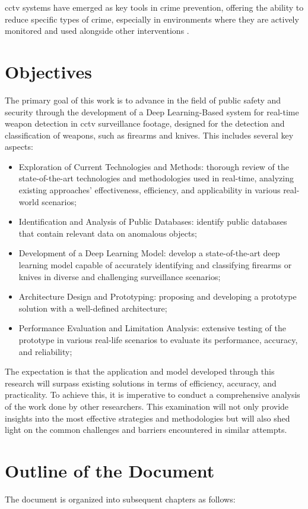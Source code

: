 \ac{cctv} systems have emerged as key tools in crime prevention, offering the ability to reduce specific types of crime, especially in environments where they are actively monitored and used alongside other interventions \cite{rfc35}. 
\section{Objectives}
The primary goal of this work is to advance in the field of public safety and security through the development of a Deep Learning-Based system for real-time weapon detection in \ac{cctv} surveillance footage, designed for the detection and classification of weapons, such as firearms and knives. This includes several key aspects:
\begin{itemize}
    \item Exploration of Current Technologies and Methods: thorough review of the state-of-the-art technologies and methodologies used in real-time, analyzing existing approaches' effectiveness, efficiency, and applicability in various real-world scenarios;
    \item Identification and Analysis of Public Databases: identify public databases that contain relevant data on anomalous objects;
    \item Development of a Deep Learning Model: develop a state-of-the-art deep learning model capable of accurately identifying and classifying firearms or knives in diverse and challenging surveillance scenarios;
    \item Architecture Design and Prototyping: proposing and developing a prototype solution with a well-defined architecture;
    \item Performance Evaluation and Limitation Analysis: extensive testing of the prototype in various real-life scenarios to evaluate its performance, accuracy, and reliability;
\end{itemize}

The expectation is that the application and model developed through this research will surpass existing solutions in terms of efficiency, accuracy, and practicality. To achieve this, it is imperative to conduct a comprehensive analysis of the work done by other researchers. This examination will not only provide insights into the most effective strategies and methodologies but will also shed light on the common challenges and barriers encountered in similar attempts.  
\section{Outline of the Document}
The document is organized into subsequent chapters as follows: 

